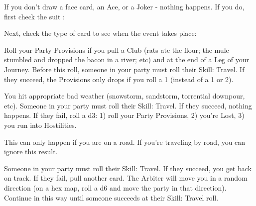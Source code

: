 {\begin{multicols}{2}
If you don't draw a face card, an Ace, or a Joker - nothing happens.  If you do, first check the suit :


  Next, check the type of card to see when the event takes place:




  Roll your Party Provisions if you pull a Club (rats ate the flour; the mule stumbled and dropped the bacon in a river; etc) and at the end of a Leg of your Journey.  Before this roll, someone in your party must roll their Skill: Travel.  If they succeed, the Provisions \UD only drops \DCDOWN if you roll a 1 (instead of a 1 or 2).  

  You hit appropriate bad weather (snowstorm, sandstorm, torrential downpour, etc).  Someone in your party must roll their Skill: Travel.  If they succeed, nothing happens.  If they fail, roll a d3:  1) roll your Party Provisions, 2) you're Lost, 3) you run into Hostilities.

  \newpage

  This can only happen if you are  on a road. If you're traveling by road, you can ignore this result.

  Someone in your party must roll their Skill: Travel.  If they succeed, you get back on track.  If they fail, pull another card. The Arbiter will move you in a random direction (on a hex map, roll a d6 and move the party in that direction). Continue in this way until someone succeeds at their Skill: Travel roll.  



\end{multicols}}
